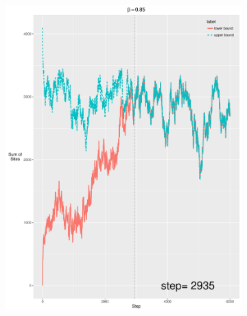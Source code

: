 \documentclass[12pt, oneside]{article}   	%
\begin{document}
\begin{figure}[H]
\begin{subfigure}[b]{0.475\textwidth}
            \includegraphics[width=\textwidth, height=0.5\textheight]{085.pdf}
        \end{subfigure} \\
        \centering
        \begin{subfigure}[b]{0.475\textwidth}
            \centering

\end{subfigure}
\end{figure}
\end{document}
